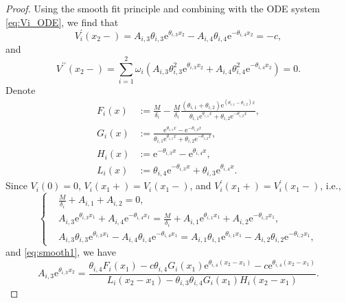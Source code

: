 \documentclass[11pt,reqno]{article}%
\numberwithin{equation}{section}
\begin{document}
\begin{proof}
Using the smooth fit principle and combining with the ODE system \eqref{eq:Vi_ODE}, we find that
\begin{equation}\label{eq:smooth1}
V^{\prime}_i(x_2-) = A_{i,3}\theta_{i,3} \mathrm{e}^{\theta_{i,3}x_2} - A_{i,4} \theta_{i,4}\mathrm{e}^{-\theta_{i,4}x_2}  = -c,
\end{equation}
and \begin{equation}\label{eq:smooth2}
V^{\prime\prime}(x_2-) = \sum\limits_{i=1}^{2}\omega_i\left(A_{i,3}\theta_{i,3}^2 \mathrm{e}^{\theta_{i,3}x_2} + A_{i,4} \theta_{i,4}^2\mathrm{e}^{-\theta_{i,4}x_2}\right) = 0.
\end{equation}
Denote
\begin{equation}\begin{aligned}\nonumber
F_i(x)&:=\frac{M}{\delta_i}-\frac{M}{\delta_i}\frac{(\theta_{i,1}+\theta_{i,2})\mathrm{e}^{(\theta_{i,1}-\theta_{i,2})x}}{\theta_{i,1}\mathrm{e}^{\theta_{i,1}x}+\theta_{i,2}\mathrm{e}^{-\theta_{i,2}x}},\\
G_i(x)&:=\frac{\mathrm{e}^{\theta_{i,1}x}-\mathrm{e}^{-\theta_{i,2}x}}{\theta_{i,1}\mathrm{e}^{\theta_{i,1}x}+\theta_{i,2}\mathrm{e}^{-\theta_{i,2}x}},\\
H_i(x)&:=\mathrm{e}^{-\theta_{i,3}x}-\mathrm{e}^{\theta_{i,4}x},\\
L_i(x)&:=\theta_{i,4}\mathrm{e}^{-\theta_{i,3}x}+\theta_{i,3}\mathrm{e}^{\theta_{i,4}x}.
\end{aligned}\end{equation}
Since $V_i(0)=0$, $V_i(x_1+)=V_i(x_1-)$, and $V^{\prime}_i(x_1+)=V^{\prime}_i(x_1-)$, i.e.,
\begin{equation}\nonumber\left\{\begin{aligned}
& \frac{M}{\delta_i} + A_{i,1} + A_{i,2} = 0, \\
& A_{i,3} \mathrm{e}^{\theta_{i,3}x_1} + A_{i,4} \mathrm{e}^{-\theta_{i,4}x_1}=\frac{M}{\delta_i} + A_{i,1} \mathrm{e}^{\theta_{i,1}x_1} + A_{i,2} \mathrm{e}^{-\theta_{i,2}x_1}, \\
& A_{i,3} \theta_{i,3} \mathrm{e}^{\theta_{i,3}x_1} - A_{i,4} \theta_{i,4} \mathrm{e}^{-\theta_{i,4}x_1}=A_{i,1} \theta_{i,1} \mathrm{e}^{\theta_{i,1}x_1} - A_{i,2} \theta_{i,2} \mathrm{e}^{-\theta_{i,2}x_1}, 
\end{aligned}\right.\end{equation}
and \eqref{eq:smooth1}, we have
\begin{equation}\label{eq:smooth3}
A_{i,3}\mathrm{e}^{\theta_{i,3}x_2}=\frac{\theta_{i,4}F_i(x_1)-c\theta_{i,4}G_i(x_1)\mathrm{e}^{\theta_{i,4}(x_2-x_1)}-c\mathrm{e}^{\theta_{i,4}(x_2-x_1)}}{L_i(x_2-x_1)-\theta_{i,3}\theta_{i,4}G_i(x_1)H_i(x_2-x_1)}.

\end{equation}
\end{proof}
\end{document}
